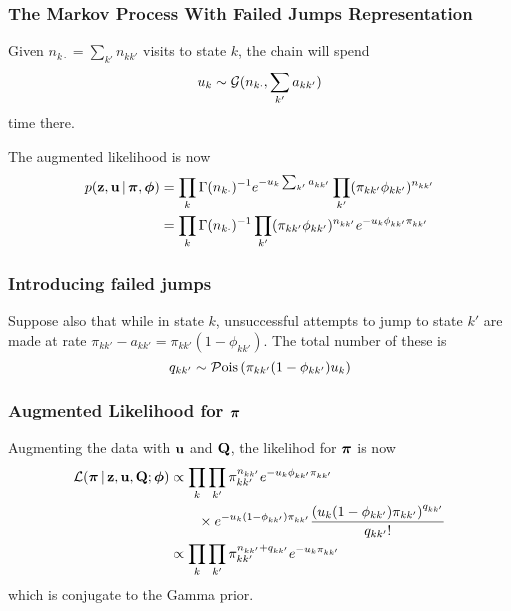 \documentclass[11pt, serif, mathserif, table,trans]{beamer}
\begin{document}
\begin{frame}
  \frametitle{The Markov Process With Failed Jumps Representation}
  Given $n_{k\cdot} = \sum_{k'} n_{kk'}$ visits to state $k$, the
  chain will spend
  \begin{equation}
    \label{eq:18}
    u_k \sim \mathcal{G}(n_{k\cdot},\sum_{k'}a_{kk'})
  \end{equation}
  time there.
  
  \pause
  \vspace{0.2in}

  The augmented likelihood is now
  \begin{align}
    \label{eq:21}
    p(\mathbf{z}, \mathbf{u} \, \vert \, \boldsymbol{\pi}, \boldsymbol{\phi}) &= \prod_{k}\Gamma(n_{k\cdot})^{-1}
    e^{-u_k \sum_{k'}a_{kk'} }\prod_{k'}
    (\pi_{kk'}\phi_{kk'})^{n_{kk'}} \\
    &= \prod_{k}\Gamma(n_{k\cdot})^{-1} \prod_{k'}
    (\pi_{kk'}\phi_{kk'})^{n_{kk'}} e^{-u_k \phi_{kk'} \pi_{kk'} }
  \end{align}
\end{frame}
\begin{frame}
  \frametitle{Introducing failed jumps}
  Suppose also that while in state $k$, unsuccessful attempts to jump
  to state $k'$ are made at rate $\pi_{kk'} - a_{kk'} = \pi_{kk'}(1 -
  \phi_{kk'})$.  The total number of these is
  \begin{equation}
    \label{eq:19}
    q_{kk'} \sim \mathcal{P}\mathrm{ois}\left(\pi_{kk'}(1 - \phi_{kk'}) u_k\right)
  \end{equation}
\end{frame}
\begin{frame}
  \frametitle{Augmented Likelihood for $\boldsymbol{\pi}$}
  Augmenting the data with $\mathbf{u}$ and $\mathbf{Q}$, the likelihod for $\boldsymbol{\pi}$
  is now
  \begin{align}
    \label{eq:20}
    \mathcal{L}(\boldsymbol{\pi} \, \vert \, \mathbf{z}, \mathbf{u}, \mathbf{Q}; \boldsymbol{\phi}) &\propto \prod_{k}\prod_{k'}
    \pi_{kk'}^{n_{kk'}} e^{-u_k\phi_{kk'}\pi_{kk'}}
    \\
    &\qquad \times e^{-u_k(1-\phi_{kk'})\pi_{kk'}}
    \frac{\left(u_k(1-\phi_{kk'})\pi_{kk'}\right)^{q_{kk'}}}{q_{kk'}!}
    \\
    &\propto \prod_{k}\prod_{k'}
    \pi_{kk'}^{n_{kk'} + q_{kk'}} e^{-u_k\pi_{kk'}}
  \end{align}
  which is conjugate to the Gamma prior.
\end{frame}
\end{document}

